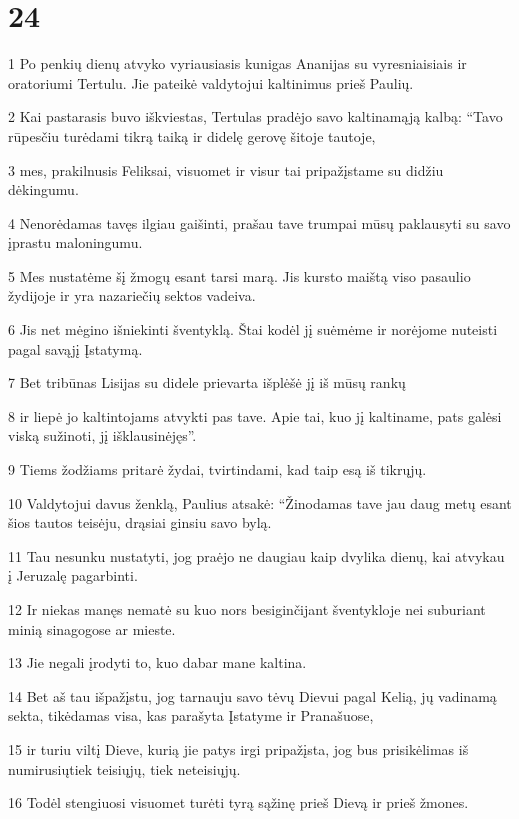 \chapter{24}


\par 1 Po penkių dienų atvyko vyriausiasis kunigas Ananijas su vyresniaisiais ir oratoriumi Tertulu. Jie pateikė valdytojui kaltinimus prieš Paulių. 
\par 2 Kai pastarasis buvo iškviestas, Tertulas pradėjo savo kaltinamąją kalbą: “Tavo rūpesčiu turėdami tikrą taiką ir didelę gerovę šitoje tautoje, 
\par 3 mes, prakilnusis Feliksai, visuomet ir visur tai pripažįstame su didžiu dėkingumu. 
\par 4 Nenorėdamas tavęs ilgiau gaišinti, prašau tave trumpai mūsų paklausyti su savo įprastu maloningumu. 
\par 5 Mes nustatėme šį žmogų esant tarsi marą. Jis kursto maištą viso pasaulio žydijoje ir yra nazariečių sektos vadeiva. 
\par 6 Jis net mėgino išniekinti šventyklą. Štai kodėl jį suėmėme ir norėjome nuteisti pagal savąjį Įstatymą. 
\par 7 Bet tribūnas Lisijas su didele prievarta išplėšė jį iš mūsų rankų 
\par 8 ir liepė jo kaltintojams atvykti pas tave. Apie tai, kuo jį kaltiname, pats galėsi viską sužinoti, jį išklausinėjęs”. 
\par 9 Tiems žodžiams pritarė žydai, tvirtindami, kad taip esą iš tikrųjų. 
\par 10 Valdytojui davus ženklą, Paulius atsakė: “Žinodamas tave jau daug metų esant šios tautos teisėju, drąsiai ginsiu savo bylą. 
\par 11 Tau nesunku nustatyti, jog praėjo ne daugiau kaip dvylika dienų, kai atvykau į Jeruzalę pagarbinti. 
\par 12 Ir niekas manęs nematė su kuo nors besiginčijant šventykloje nei suburiant minią sinagogose ar mieste. 
\par 13 Jie negali įrodyti to, kuo dabar mane kaltina. 
\par 14 Bet aš tau išpažįstu, jog tarnauju savo tėvų Dievui pagal Kelią, jų vadinamą sekta, tikėdamas visa, kas parašyta Įstatyme ir Pranašuose, 
\par 15 ir turiu viltį Dieve, kurią jie patys irgi pripažįsta, jog bus prisikėlimas iš numirusių­tiek teisiųjų, tiek neteisiųjų. 
\par 16 Todėl stengiuosi visuomet turėti tyrą sąžinę prieš Dievą ir prieš žmones. 
